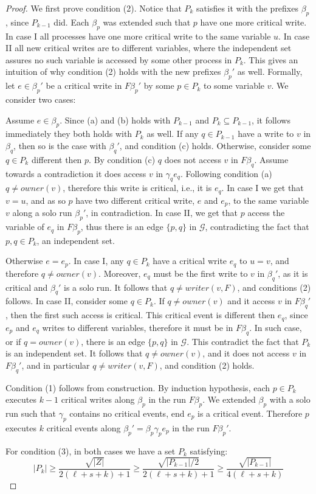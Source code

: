  \begin{proof}
 	We first prove condition (2). Notice that $P_k$ satisfies it with the prefixes $\beta_p$, since $P_{k-1}$ did. Each $\beta_p$ was extended such that $p$ have one more critical write. In case I all processes have one more critical write to the same variable $u$. In case II all new critical writes are to different variables, where the independent set assures no such variable is accessed by some other process in $P_k$. This gives an intuition of why condition (2) holds with the new prefixes $\beta_p'$ as well. Formally, let $e \in \beta_p'$ be a critical write in $F \beta_p'$ by some $p \in P_k$ to some variable $v$. We consider two cases:
 	
 	Assume $e \in \beta_p$. Since (a) and (b) holds with $P_{k-1}$ and $P_k \subseteq P_{k-1}$, it follows immediately they both holds with $P_k$ as well. If any $q \in P_{k-1}$ have a write to $v$ in $\beta_q$, then so is the case with $\beta_q'$, and condition (c) holds. Otherwise, consider some $q \in P_k$ different then $p$. By condition (c) $q$ does not access $v$ in $F \beta_q$. Assume towards a contradiction it does access $v$ in $\gamma_q e_q$. Following condition (a) $q \neq owner(v)$, therefore this write is critical, i.e., it is $e_q$. In case I we get that $v=u$, and as so $p$ have two different critical write, $e$ and $e_p$, to the same variable $v$ along a solo run $\beta_p'$, in contradiction. In case II, we get that $p$ access the variable of $e_q$ in $F \beta_p$, thus there is an edge $\{p,q\}$ in $\mathcal{G}$, contradicting the fact that $p,q \in P_k$, an independent set.
 	
 	Otherwise $e=e_p$.
 	In case I, any $q \in P_k$ have a critical write $e_q$ to $u=v$, and therefore $q \neq owner(v)$. Moreover, $e_q$ must be the first write to $v$ in $\beta_q'$, as it is critical and $\beta_q'$ is a solo run. It follows that $q \neq writer(v,F)$, and conditions (2) follows.
 	In case II, consider some $q \in P_k$. If $q \neq owner(v)$ and it access $v$ in $F \beta_q'$, then the first such access is critical. This critical event is different then $e_q$, since $e_p$ and $e_q$ writes to different variables, therefore it must be in $F \beta_q$. In such case, or if $q = owner(v)$, there is an edge $\{p,q\}$ in $\mathcal{G}$. This contradict the fact that $P_k$ is an independent set. It follows that $q \neq owner(v)$, and it does not access $v$ in $F \beta_q'$, and in particular $q \neq writer(v,F)$, and condition (2) holds.
 	
 	Condition (1) follows from construction. By induction hypothesis, each $p \in P_k$ executes $k-1$ critical writes along $\beta_p$ in the run $F \beta_p$. We extended $\beta_p$ with a solo run such that $\gamma_p$ contains no critical events, end $e_p$ is a critical event. Therefore $p$ executes $k$ critical events along $\beta_p' = \beta_p \gamma_p e_p$ in the run $F \beta_p'$.
 	
 	For condition (3), in both cases we have a set $P_k$ satisfying:
 	$$|P_k| \geq \frac{\sqrt{|Z|}}{2(\ell+s+k)+1} \geq \frac{\sqrt{|P_{k-1}|/2}}{2(\ell+s+k)+1} \geq \frac{\sqrt{|P_{k-1}|}}{4(\ell+s+k)}$$
 \end{proof}

